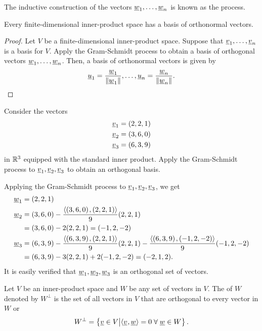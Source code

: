 The inductive construction of the vectors $\underline{w}_1, \ldots, \underline{w}_n$ is known as the  process.

\begin{corollary}
\label{cor:orthonormal_basis}
Every finite-dimensional inner-product space has a basis of orthonormal vectors.
\end{corollary}
\begin{proof}
Let $V$ be a finite-dimensional inner-product space.
Suppose that $\underline{v}_1, \ldots, \underline{v}_n$ is a basis for $V$.
Apply the Gram-Schmidt process to obtain a basis of orthogonal vectors $\underline{w}_1, \ldots, \underline{w}_n$.
Then, a basis of orthonormal vectors is given by
\begin{equation*}
\underline{u}_1 = \frac{ \underline{w}_1 }{ \left\| \underline{w}_1 \right\| }, \ldots,
\underline{u}_n = \frac{ \underline{w}_n }{ \left\| \underline{w}_n \right\| }.
\end{equation*}
\end{proof}

\begin{example}
Consider the vectors
\begin{align*}
\underline{v}_1 &= (2,2,1) \\
\underline{v}_2 &= (3,6,0) \\
\underline{v}_3 &= (6,3,9)
\end{align*}
in $\mathbb{R}^3$ equipped with the standard inner product.
Apply the Gram-Schmidt process to $\underline{v}_1, \underline{v}_2, \underline{v}_3$ to obtain an orthogonal basis.

Applying the Gram-Schmidt process to $\underline{v}_1, \underline{v}_2, \underline{v}_3$, we get
\begin{align*}
\underline{w}_1 &= (2,2,1) \\
\underline{w}_2 &= (3,6,0)
- \frac{ {\left\langle  (3,6,0)  \mskip2mu ,  (2,2,1)  \right\rangle} }{ 9 } (2,2,1) \\
&= (3,6,0) - 2 (2,2,1) = (-1,2,-2) \\
\underline{w}_3 &= (6,3,9)
- \frac{ {\left\langle  (6,3,9)  \mskip2mu ,  (2,2,1)  \right\rangle} }{ 9 } (2,2,1)
- \frac{ {\left\langle  (6,3,9)  \mskip2mu ,  (-1,2,-2)  \right\rangle} }{ 9 } (-1,2,-2) \\
&= (6,3,9) - 3 (2,2,1) + 2 (-1,2,-2) = (-2,1,2) .
\end{align*}
It is easily verified that $\underline{w}_1, \underline{w}_2, \underline{w}_3$ is an orthogonal set of vectors.
\end{example}

\begin{definition}
Let $V$ be an inner-product space and $W$ be any set of vectors in $V$.
The  of $W$ denoted by $W^{\bot}$ is the set of all vectors in $V$ that are orthogonal to every vector in $W$ or
\begin{equation*}
W^{\bot} = \left\{ \underline{v} \in V \big| {\langle  \underline{v}  \mskip1mu ,  \underline{w}  \rangle} = 0 \; \forall \; \underline{w}\in W \right\}. 
\end{equation*}
\end{definition}


